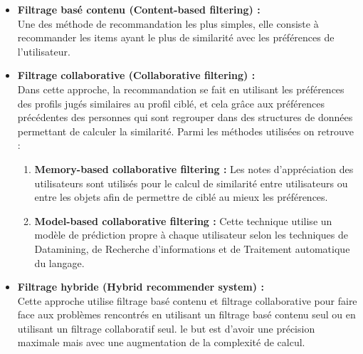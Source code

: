 \begin{itemize}
    \item \textbf{Filtrage basé contenu (Content-based filtering) :\\}
    Une des méthode de recommandation les plus simples, elle consiste à recommander les items ayant le plus de similarité avec les préférences de l'utilisateur.\\

    \item \textbf{Filtrage collaborative (Collaborative filtering) :\\}
    Dans cette approche, la recommandation se fait en utilisant les préférences des profils jugés similaires au profil ciblé, et cela grâce aux préférences précédentes des personnes qui sont regrouper dans des structures de données permettant de calculer la similarité. Parmi les méthodes utilisées on retrouve :
        \begin{enumerate}
            \item \textbf{Memory-based collaborative filtering : }Les notes d'appréciation des utilisateurs sont utilisés pour le calcul de similarité entre utilisateurs ou entre les objets afin de permettre de ciblé au mieux les préférences.\\
            \item \textbf{Model-based collaborative filtering : }Cette technique utilise un modèle de prédiction propre à chaque utilisateur selon les techniques de Datamining, de Recherche d'informations et de Traitement automatique du langage.\\
        \end{enumerate}

    \item \textbf{Filtrage hybride (Hybrid recommender system) :\\}
    Cette approche utilise filtrage basé contenu et filtrage collaborative pour faire face aux problèmes rencontrés en utilisant un filtrage basé contenu seul ou en utilisant un filtrage collaboratif seul. le but est d'avoir une précision maximale mais avec une augmentation de la complexité de calcul.\cite{filtering}
\end{itemize}

